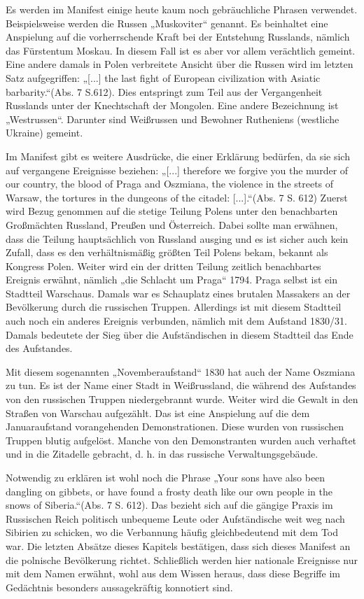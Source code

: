 \documentclass[12pt,headsepline,a4paper]{scrartcl}
\begin{document}
Es werden im Manifest einige heute kaum noch gebräuchliche Phrasen verwendet. Beispielsweise
werden die Russen „Muskoviter“ genannt. Es beinhaltet eine Anspielung auf die vorherrschende
Kraft bei der Entstehung Russlands, nämlich das Fürstentum Moskau. In diesem Fall ist es aber vor
allem verächtlich gemeint. Eine andere damals in Polen verbreitete Ansicht über die Russen wird im
letzten Satz aufgegriffen: „[...] the last fight of European civilization with Asiatic barbarity.“(Abs. 7
S.612). Dies entspringt zum Teil aus der Vergangenheit Russlands unter der Knechtschaft der
Mongolen. Eine andere Bezeichnung ist „Westrussen“. Darunter sind Weißrussen und Bewohner
Rutheniens (westliche Ukraine) gemeint.

Im Manifest gibt es weitere Ausdrücke, die einer Erklärung bedürfen, da sie sich auf vergangene
Ereignisse beziehen: „[...] therefore we forgive you the murder of our country, the blood of Praga
and Oszmiana, the violence in the streets of Warsaw, the tortures in the dungeons of the citadel:
[...].“(Abs. 7 S. 612) Zuerst wird Bezug genommen auf die stetige Teilung Polens unter den
benachbarten Großmächten Russland, Preußen und Österreich. Dabei sollte man erwähnen, dass die
Teilung hauptsächlich von Russland ausging und es ist sicher auch kein Zufall, dass es den
verhältnismäßig größten Teil Polens bekam, bekannt als Kongress Polen. Weiter wird ein der dritten
Teilung zeitlich benachbartes Ereignis erwähnt, nämlich „die Schlacht um Praga“ 1794. Praga selbst
ist ein Stadtteil Warschaus. Damals war es Schauplatz eines brutalen Massakers an der Bevölkerung
durch die russischen Truppen. Allerdings ist mit diesem Stadtteil auch noch ein anderes Ereignis
verbunden, nämlich mit dem Aufstand 1830/31. Damals bedeutete der Sieg über die Aufständischen
in diesem Stadtteil das Ende des Aufstandes.

Mit diesem sogenannten „Novemberaufstand“ 1830 hat auch der Name Oszmiana zu tun. Es ist der
Name einer Stadt in Weißrussland, die während des Aufstandes von den russischen Truppen
niedergebrannt wurde. Weiter wird die Gewalt in den Straßen von Warschau aufgezählt. Das ist eine
Anspielung auf die dem Januaraufstand vorangehenden Demonstrationen. Diese wurden von
russischen Truppen blutig aufgelöst. Manche von den Demonstranten wurden auch verhaftet und in
die Zitadelle gebracht, d. h. in das russische Verwaltungsgebäude.

Notwendig zu erklären ist wohl noch die Phrase „Your sons have also been dangling on gibbets, or
have found a frosty death like our own people in the snows of Siberia.“(Abs. 7 S. 612). Das bezieht
sich auf die gängige Praxis im Russischen Reich politisch unbequeme Leute oder Aufständische
weit weg nach Sibirien zu schicken, wo die Verbannung häufig gleichbedeutend mit dem Tod war.
Die letzten Absätze dieses Kapitels bestätigen, dass sich dieses Manifest an die polnische
Bevölkerung richtet. Schließlich werden hier nationale Ereignisse nur mit dem Namen erwähnt,
wohl aus dem Wissen heraus, dass diese Begriffe im Gedächtnis besonders aussagekräftig
konnotiert sind.
\end{document}

